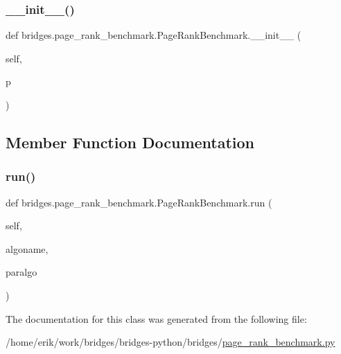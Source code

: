 \subsubsection{\texorpdfstring{\+\_\+\+\_\+init\+\_\+\+\_\+()}{\_\_init\_\_()}}
{\footnotesize\ttfamily def bridges.\+page\+\_\+rank\+\_\+benchmark.\+Page\+Rank\+Benchmark.\+\_\+\+\_\+init\+\_\+\+\_\+ (\begin{DoxyParamCaption}\item[{}]{self,  }\item[{}]{p }\end{DoxyParamCaption})}



\subsection{Member Function Documentation}
\mbox{\label{classbridges_1_1page__rank__benchmark_1_1_page_rank_benchmark_ab1e8da6b9ec3e3858f23bcffb42c5f6c}} 
\subsubsection{\texorpdfstring{run()}{run()}}
{\footnotesize\ttfamily def bridges.\+page\+\_\+rank\+\_\+benchmark.\+Page\+Rank\+Benchmark.\+run (\begin{DoxyParamCaption}\item[{}]{self,  }\item[{}]{algoname,  }\item[{}]{paralgo }\end{DoxyParamCaption})}



The documentation for this class was generated from the following file\+:\begin{DoxyCompactItemize}
\item 
/home/erik/work/bridges/bridges-\/python/bridges/\hyperlink{page__rank__benchmark_8py}{page\+\_\+rank\+\_\+benchmark.\+py}\end{DoxyCompactItemize}
